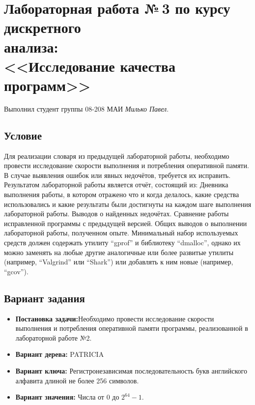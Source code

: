 \documentclass[12pt]{article}
\begin{document}
\section*{\centering Лабораторная работа №\,3 по курсу дискретного\\ анализа: \\<<Исследование качества программ>>}

Выполнил студент группы 08-208 МАИ \textit{Милько Павел}.
\subsection*{Условие}
Для реализации словаря из предыдущей лабораторной работы,
необходимо провести исследование скорости выполнения и потребления
оперативной памяти. В случае выявления ошибок или явных недочётов,
требуется их исправить.
Результатом лабораторной работы является отчёт, состоящий из:
Дневника выполнения работы, в котором отражено что и когда
делалось, какие средства использовались и какие результаты были
достигнуты на каждом шаге выполнения лабораторной работы.
Выводов о найденных недочётах.
Сравнение работы исправленной программы с предыдущей версией.
Общих выводов о выполнении лабораторной работы, полученном
опыте.
Минимальный набор используемых средств должен содержать утилиту
``gprof'' и библиотеку ``dmalloc'', однако их можно заменять на любые другие
аналогичные или более развитые утилиты (например, ``Valgrind'' или ``Shark'')
или добавлять к ним новые (например, ``gcov'').

\subsection*{Вариант задания}
\begin{itemize}
	\item {\bf Постановка задачи:}\subitem Необходимо провести исследование скорости выполнения и потребления оперативной памяти программы, реализованной в лабораторной работе №2.
	
	\item {\bf Вариант дерева: }\subitem  PATRICIA

	\item{ \bf Вариант ключа:} \subitem Регистронезависимая последовательность букв английского алфавита длиной не более 256 символов.


	\item {\bf Вариант значения:} \subitem   Числа от $0$ до $2^{64} − 1$.

\end{itemize}
\newpage
\end{document}
